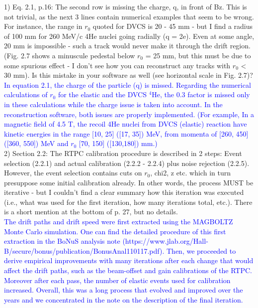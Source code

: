 1) Eq. 2.1, p.16: The second row is missing the charge, q, in front of Bz. This 
is not trivial, as the next 3 lines contain numerical examples that seem to be 
wrong. For instance, the range in $r_{0}$ quoted for DVCS is 20 - 45 mm - but I 
find a radius of 100 mm for 260 MeV/c 4He nuclei going radially (q = 2e). Even 
at some angle, 20 mm is impossible - such a track would never make it through 
the drift region. (Fig. 2.7 shows a minuscule pedestal below $r_{0}$ = 25 mm, but 
this must be due to some spurious effect - I don't see how you can reconstruct 
any tracks with $r_{0}$ < 30 mm). Is this mistake in your software as well (see 
horizontal scale in Fig. 2.7)?\\
\textcolor{blue}{
   In equation 2.1, the charge of the particle (q) is missed. Regarding the 
numerical calculations of $r_0$ for the elastic and the DVCS $^4$He, the 0.3 
factor is missed only in these calculations while the charge issue is taken 
into account. In the reconstruction software, both issues are properly 
implemented.  (For example, In a magnetic field of 4.5 T, the recoil 4He nuclei 
from DVCS (elastic) reaction have kinetic energies in the range [10, 25] ([17, 
35]) MeV, from momenta of [260, 450] ([360, 550]) MeV and $r_0$ [70, 150] 
([130,180]) mm.) }\\

2) Section 2.2: The RTPC calibration procedure is described in 2 steps: Event 
selection (2.2.1) and actual calibration (2.2.2 - 2.2.4) plus noise rejection 
(2.2.5). However, the event selection contains cuts on $r_0$, chi2, z etc.  
which in turn presuppose some initial calibration already. In other words, the 
process MUST be iterative - but I couldn't find a clear summary how this 
iteration was executed (i.e., what was used for the first iteration, how many 
iterations total, etc.). There is a short mention at the bottom of p. 27, but 
no details.\\
\textcolor{blue}{The drift paths and drift speed were first extracted using the 
MAGBOLTZ Monte Carlo simulation. One can find the detailed procedure of 
this first extraction in the BoNuS analysis note 
(https://www.jlab.org/Hall-B/secure/bonus/publication/BonusAnal110117.pdf).  
Then, we proceeded to derive empirical improvements with many iterations after 
each change that would affect the drift paths, such as the beam-offset
 and gain calibrations of the RTPC. Moreover after each pass, the number of
elastic events used for calibration increased. Overall, this was a long 
process that evolved and improved over the years and we concentrated in the 
note on the description of the final iteration.}\\

